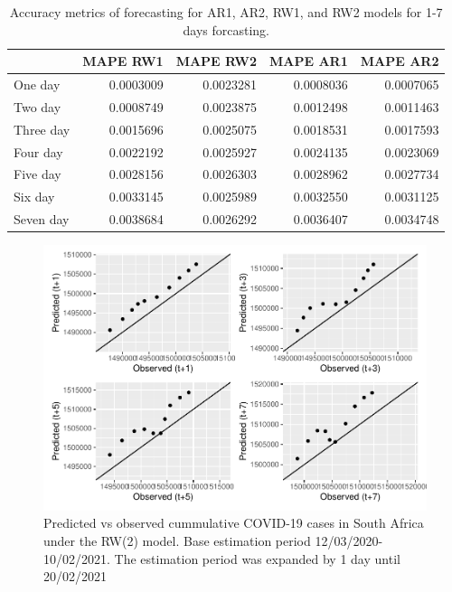 \documentclass[10pt,letterpaper]{article}
\begin{document}
\begin{table}[!h]

\caption{\label{tab:unnamed-chunk-12}Accuracy metrics of forecasting for AR1, AR2, RW1, and RW2 models for 1-7 days forcasting.}
\centering
\begin{tabular}[t]{l|r|r|r|r}
\hline
  & MAPE RW1 & MAPE RW2 & MAPE AR1 & MAPE AR2\\
\hline
One day & 0.0003009 & 0.0023281 & 0.0008036 & 0.0007065\\
\hline
Two day & 0.0008749 & 0.0023875 & 0.0012498 & 0.0011463\\
\hline
Three day & 0.0015696 & 0.0025075 & 0.0018531 & 0.0017593\\
\hline
Four day & 0.0022192 & 0.0025927 & 0.0024135 & 0.0023069\\
\hline
Five day & 0.0028156 & 0.0026303 & 0.0028962 & 0.0027734\\
\hline
Six day & 0.0033145 & 0.0025989 & 0.0032550 & 0.0031125\\
\hline
Seven day & 0.0038684 & 0.0026292 & 0.0036407 & 0.0034748\\
\hline
\end{tabular}
\end{table}

\begin{figure}[H]
\includegraphics[width=0.99\linewidth]{COVIDincidenceSA_files/figure-latex/accuracy-1} \caption{Predicted vs observed cummulative COVID-19 cases in South Africa under the RW(2) model. Base estimation period 12/03/2020-10/02/2021. The estimation period was expanded by 1 day until 20/02/2021}\label{fig:accuracy}
\end{figure}
\end{document}

